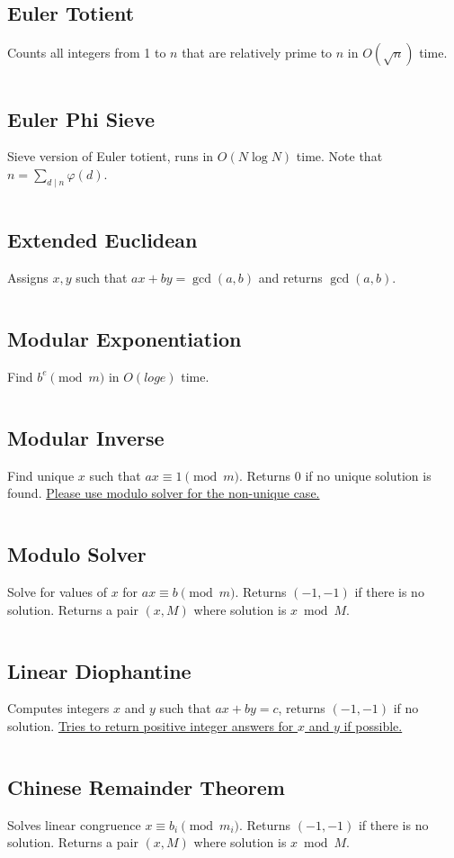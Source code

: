 \documentclass[8pt,a4paper,landscape,oneside]{amsart}
\newcommand{\code}[1]{\inputminted[fontsize=\normalsize,baselinestretch=1]{cpp}{_code/#1}}
\begin{document}
\begin{multicols*}{3}
  \subsection{Euler Totient}
    Counts all integers from 1 to $n$ that are relatively prime to $n$ in $O(\sqrt{n})$ time.
    \code{numtheory/totient.cpp}
  \subsection{Euler Phi Sieve}
    Sieve version of Euler totient, runs in $O(N \log N)$ time. Note that $n = \sum_{d\mid n} \varphi(d)$.
    \code{numtheory/phi-sieve.cpp}
  \subsection{Extended Euclidean}
    Assigns $x,y$ such that $ax + by = \gcd(a,b)$ and returns $\gcd(a,b)$.
    \code{numtheory/extended-euclidean.cpp}
  \subsection{Modular Exponentiation}
    Find $b^e \pmod m$ in $O(log e)$ time.
    \code{numtheory/mod_pow.cpp}
  \subsection{Modular Inverse}
    Find unique $x$ such that $ax \equiv 1 \pmod m$. Returns 0 if no unique solution is found. \underline{Please use modulo solver for the non-unique case.}
    \code{numtheory/modinv.cpp}
  \subsection{Modulo Solver}
    Solve for values of $x$ for $ax \equiv b \pmod m$. Returns $(-1,-1)$ if there is no solution. Returns a pair $(x, M)$ where solution is $x \bmod M$.
    \code{numtheory/modsolver.cpp}
  \subsection{Linear Diophantine}
    Computes integers $x$ and $y$ such that $ax+by=c$, returns $(-1,-1)$ if no solution. \underline{Tries to return positive integer answers for $x$ and $y$ if possible.}
    \code{numtheory/linear-diophantine.cpp}
  \subsection{Chinese Remainder Theorem}
    Solves linear congruence $x \equiv b_i \pmod {m_i}$. Returns $(-1,-1)$ if there is no solution. Returns a pair $(x, M)$ where solution is $x \bmod M$.
    \code{numtheory/chinese-remainder.cpp}

\end{multicols*}
\end{document}
